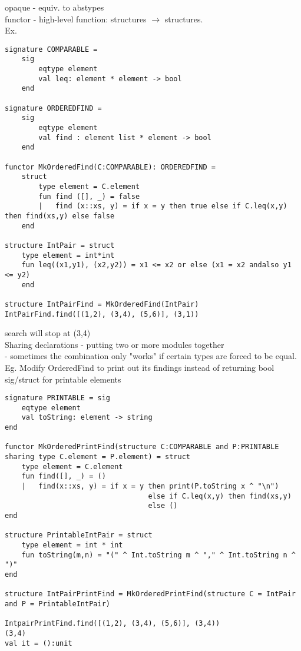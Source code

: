 \documentclass[11pt]{article}
\begin{document}
opaque - equiv. to abstypes \\

functor - high-level function: structures $\rightarrow$ structures. \\

Ex.
\begin{verbatim}
signature COMPARABLE = 
	sig
		eqtype element 
		val leq: element * element -> bool
	end

signature ORDEREDFIND = 
	sig
		eqtype element
		val find : element list * element -> bool
	end
	
functor MkOrderedFind(C:COMPARABLE): ORDEREDFIND = 
	struct
		type element = C.element
		fun find ([], _) = false
		|   find (x::xs, y) = if x = y then true else if C.leq(x,y) then find(xs,y) else false
	end

structure IntPair = struct
	type element = int*int
	fun leq((x1,y1), (x2,y2)) = x1 <= x2 or else (x1 = x2 andalso y1 <= y2)
	end
	
structure IntPairFind = MkOrderedFind(IntPair)
IntPairFind.find([(1,2), (3,4), (5,6)], (3,1)) 
\end{verbatim}

search will stop at (3,4) \\

Sharing declarations - putting two or more modules together \\

- sometimes the combination only "works" if certain types are forced to be equal. \\

Eg. Modify OrderedFind to print out its findings instead of returning bool \\

sig/struct for printable elements
\begin{verbatim}
signature PRINTABLE = sig
	eqtype element
	val toString: element -> string
end

functor MkOrderedPrintFind(structure C:COMPARABLE and P:PRINTABLE 
sharing type C.element = P.element) = struct
	type element = C.element
	fun find([], _) = ()
	|   find(x::xs, y) = if x = y then print(P.toString x ^ "\n")
								  else if C.leq(x,y) then find(xs,y)
								  else ()
end

structure PrintableIntPair = struct
	type element = int * int
	fun toString(m,n) = "(" ^ Int.toString m ^ "," ^ Int.toString n ^ ")"
end

structure IntPairPrintFind = MkOrderedPrintFind(structure C = IntPair and P = PrintableIntPair)

IntpairPrintFind.find([(1,2), (3,4), (5,6)], (3,4)) 
(3,4)
val it = ():unit
\end{verbatim}
\end{document}
